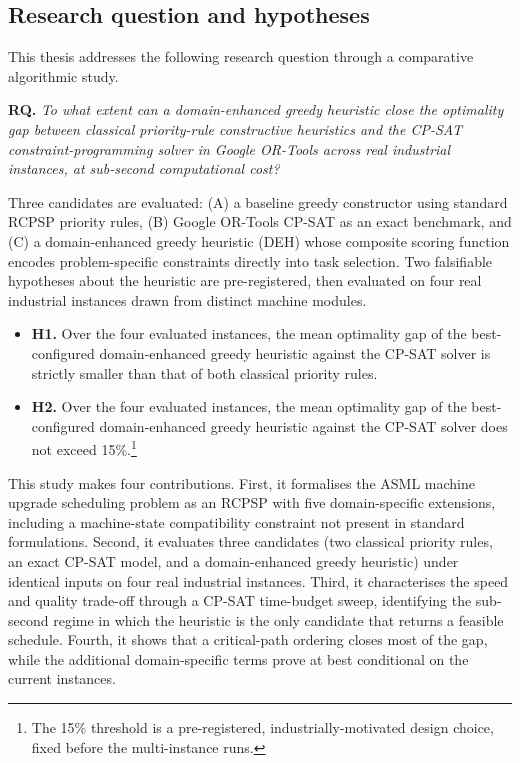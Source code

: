 \documentclass[conference]{IEEEtran}
\begin{document}
\subsection{Research question and hypotheses}
\label{sec:rqs}

This thesis addresses the following research question through a
comparative algorithmic study.

\smallskip
\noindent\textbf{RQ.} \emph{To what extent can a domain-enhanced
greedy heuristic close the optimality gap between classical
priority-rule constructive heuristics and the CP-SAT
constraint-programming solver in Google OR-Tools across real
industrial instances, at sub-second computational cost?}
\smallskip

Three candidates are evaluated: (A) a baseline greedy constructor
using standard RCPSP priority rules, (B) Google OR-Tools CP-SAT as an
exact benchmark, and (C) a domain-enhanced greedy heuristic (DEH) whose
composite scoring function encodes problem-specific constraints
directly into task selection. Two falsifiable hypotheses about the
heuristic are pre-registered, then evaluated on four real industrial
instances drawn from distinct machine modules.

\begin{itemize}
  \item \textbf{H1.} Over the four evaluated instances, the mean
  optimality gap of the best-configured domain-enhanced greedy
  heuristic against the CP-SAT solver is strictly smaller than
  that of both classical priority rules.
  \item \textbf{H2.} Over the four evaluated instances, the mean
  optimality gap of the best-configured domain-enhanced greedy
  heuristic against the CP-SAT solver does not exceed
  15\%.\footnote{The 15\% threshold is a pre-registered,
  industrially-motivated design choice, fixed before the multi-instance
  runs.}
\end{itemize}

This study makes four contributions. First, it formalises the ASML
machine upgrade scheduling problem as an RCPSP with five domain-specific
extensions, including a machine-state compatibility constraint not
present in standard formulations. Second, it evaluates three
candidates (two classical priority rules, an exact CP-SAT model, and a
domain-enhanced greedy heuristic) under identical inputs on four real
industrial instances. Third, it characterises the speed and quality
trade-off through a CP-SAT time-budget sweep, identifying the
sub-second regime in which the heuristic is the only candidate that
returns a feasible schedule. Fourth, it shows that a critical-path ordering closes most of the
gap, while the additional domain-specific terms prove at best
conditional on the current instances.
\end{document}
